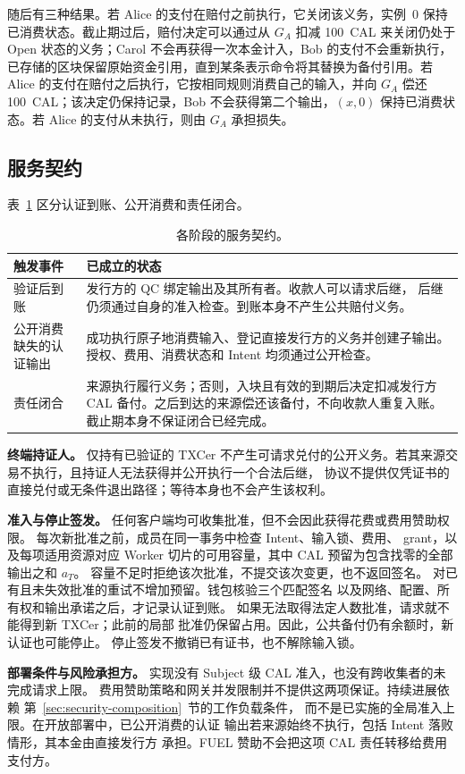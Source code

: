 随后有三种结果。若 Alice 的支付在赔付之前执行，它关闭该义务，实例~0 保持已消费状态。截止期过后，赔付决定可以通过从 $G_A$ 扣减 100~CAL 来关闭仍处于 Open 状态的义务；Carol 不会再获得一次本金计入，Bob 的支付不会重新执行，已存储的区块保留原始资金引用，直到某条表示命令将其替换为备付引用。若 Alice 的支付在赔付之后执行，它按相同规则消费自己的输入，并向 $G_A$ 偿还 100~CAL；该决定仍保持记录，Bob 不会获得第二个输出，$(x,0)$ 保持已消费状态。若 Alice 的支付从未执行，则由 $G_A$ 承担损失。

\subsection{服务契约}
\label{sec:model-contract}
表~\ref{tab:model-contract} 区分认证到账、公开消费和责任闭合。

\begin{table}[!t]
\caption{各阶段的服务契约。}
\label{tab:model-contract}
\centering\small
\begin{tabular}{@{}>{\raggedright\arraybackslash}p{}>{\raggedright\arraybackslash}p{}@{}}
\toprule
触发事件 & 已成立的状态 \\
\midrule
验证后到账 &
发行方的 QC 绑定输出及其所有者。收款人可以请求后继，
后继仍须通过自身的准入检查。到账本身不产生公共赔付义务。 \\
公开消费缺失的认证输出 &
成功执行原子地消费输入、登记直接发行方的义务并创建子输出。
授权、费用、消费状态和 Intent 均须通过公开检查。 \\
责任闭合 &
来源执行履行义务；否则，入块且有效的到期后决定扣减发行方
CAL 备付。之后到达的来源偿还该备付，不向收款人重复入账。
截止期本身不保证闭合已经完成。 \\
\bottomrule
\end{tabular}
\end{table}

\noindent\textbf{终端持证人。}
仅持有已验证的 TXCer 不产生可请求兑付的公开义务。若其来源交易不执行，且持证人无法获得并公开执行一个合法后继，
协议不提供仅凭证书的直接兑付或无条件退出路径；等待本身也不会产生该权利。

\noindent\textbf{准入与停止签发。}
任何客户端均可收集批准，但不会因此获得花费或费用赞助权限。
每次新批准之前，成员在同一事务中检查 Intent、输入锁、费用、
grant，以及每项适用资源对应 Worker 切片的可用容量，其中 CAL 预留为包含找零的全部输出之和 $a_T$。
容量不足时拒绝该次批准，不提交该次变更，也不返回签名。
对已有且未失效批准的重试不增加预留。钱包核验三个匹配签名
以及网络、配置、所有权和输出承诺之后，才记录认证到账。
如果无法取得法定人数批准，请求就不能得到新 TXCer；此前的局部
批准仍保留占用。因此，公共备付仍有余额时，新认证也可能停止。
停止签发不撤销已有证书，也不解除输入锁。

\noindent\textbf{部署条件与风险承担方。}
实现没有 Subject 级 CAL 准入，也没有跨收集者的未完成请求上限。
费用赞助策略和网关并发限制并不提供这两项保证。持续进展依赖
第~\ref{sec:security-composition}~节的工作负载条件，
而不是已实施的全局准入上限。在开放部署中，已公开消费的认证
输出若来源始终不执行，包括 Intent 落败情形，其本金由直接发行方
承担。FUEL 赞助不会把这项 CAL 责任转移给费用支付方。
